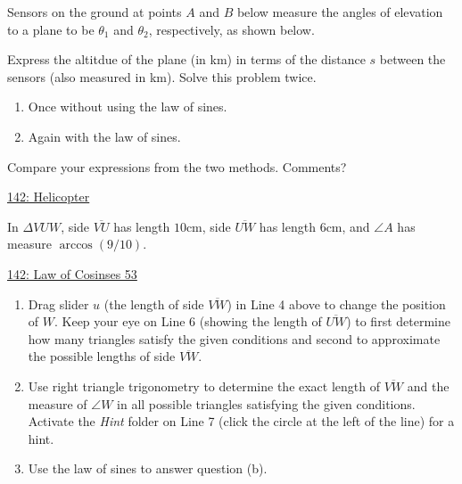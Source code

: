 \documentclass{ximera}
\begin{document}
\begin{question} \label{Q454ddtgHHERER}
Sensors on the ground at points $A$ and $B$ below measure the angles of elevation to a plane to be $\theta_1$ and $\theta_2$, respectively, as shown below.

Express the altitdue of the plane (in km) in terms of the distance $s$ between the sensors (also measured in km). Solve this problem twice.

\begin{enumerate}
\item Once without using the law of sines.

\item Again with the law of sines.
\end{enumerate}

Compare your expressions from the two methods. Comments?


\begin{onlineOnly}
    \begin{center}
\end{center}
\end{onlineOnly}

\href{https://www.desmos.com/calculator/zbktegkke4}{142: Helicopter}

\end{question}


\begin{question} \label{Q444f44tgHHERER}
In $\Delta VUW$, side $\overline{VU}$ has length $10$cm, side $\overline{UW}$ has length $6$cm, and  $\angle A$ has measure $\arccos(9/10)$.

\begin{onlineOnly}
    \begin{center}
\end{center}
\end{onlineOnly}

\href{https://www.desmos.com/calculator/a2m3iexwfx}{142: Law of Cosinses 53}

\begin{enumerate}
\item Drag slider $u$ (the length of side $\overline{VW}$) in Line 4 above to change the position of $W$. Keep your eye on Line 6 (showing the length of $\overline{UW}$) to first determine how many triangles satisfy the given conditions and second to approximate the possible lengths of side $\overline{VW}$.

\item Use right triangle trigonometry to determine the exact length of $\overline{VW}$ and the measure of $\angle W$ in all possible triangles satisfying the given conditions. Activate the \emph{Hint} folder on Line 7 (click the circle at the left of the line) for a hint.

\item Use the law of sines to answer question (b).

 
\end{enumerate}

\end{question}
\end{document}
